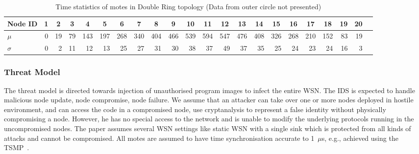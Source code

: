 \documentclass[conference]{IEEEtran}
\newcommand*{\bd}[1]{\multicolumn{1}{|c|}{\bfseries #1}}
\begin{document}
\begin{table}[t!]
\centering
\begin{tabular}{|l|*{20}{r|}r|}
\hline
\bd{Node ID}           & \bd{1} & \bd{2} & \bd{3} & \bd{4} & \bd{5} & \bd{6} & \bd{7} & \bd{8} & \bd{9} & \bd{10} & \bd{11} & \bd{12} & \bd{13} & \bd{14} & \bd{15} & \bd{16} & \bd{17} & \bd{18} & \bd{19} & \bd{20} \\
\hline
$\mu$            & 0 &19 & 79& 143&197 &268&340&404&466&539 &594 &547 &476 &408 &326 & 268&210 & 152 & 83 & 19 \\
$\sigma$		 & 0 & 2 & 11 & 12 & 13 & 25& 27&31 &30 & 38 & 37 & 49 & 37 & 35 & 25  & 24 & 23 & 24 & 16 & 3 \\
\hline
\end{tabular}
\caption{Time statistics of motes in Double Ring topology (Data from outer circle not presented)}
\label{tab:stat_ellip}
\end{table}

\subsubsection*{Threat Model}
The threat model is directed towards injection of unauthorised program images to infect the entire WSN.
The IDS is expected to handle malicious node update, node compromise, node failure.
We assume that an  attacker  can take over one or more nodes deployed in hostile environment, and can access the code in a compromised node, use cryptanalysis to represent a false identity without physically compromising a node.
However, he has  no special  access to  the  network and is unable to modify the underlying protocols running in the uncompromised nodes.
The paper assumes several WSN settings like static WSN with a single  sink which is  protected from all kinds of attacks and cannot be compromised. All motes are assumed to have time synchronisation accurate to 1~$\mu$s, e.g., achieved using the TSMP~\cite{Pister08tsmp:time}.
\end{document}
